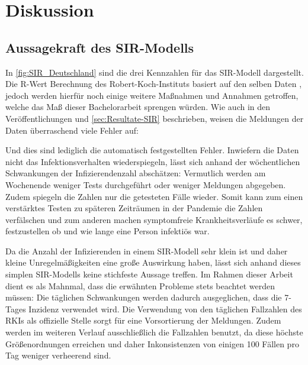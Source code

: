 \chapter{Diskussion}\label{chap:Diskussion}
\section{Aussagekraft des SIR-Modells}
In \autoref{fig:SIR_Deutschland} sind die drei Kennzahlen für das SIR-Modell dargestellt. Die R-Wert Berechnung des Robert-Koch-Instituts basiert auf den selben Daten \autocite{}, jedoch werden hierfür noch einige weitere Maßnahmen und Annahmen getroffen, welche das Maß dieser Bachelorarbeit sprengen würden.
Wie auch in den Veröffentlichungen und \autoref{sec:Resultate-SIR} beschrieben, weisen die Meldungen der Daten überraschend viele Fehler auf: 

Und dies sind lediglich die automatisch festgestellten Fehler. Inwiefern die Daten nicht das Infektionsverhalten wiederspiegeln, lässt sich anhand der wöchentlichen Schwankungen der Infizierendenzahl abschätzen: Vermutlich werden am Wochenende weniger Tests durchgeführt oder weniger Meldungen abgegeben. 
Zudem spiegeln die Zahlen nur die getesteten Fälle wieder. Somit kann zum einen verstärktes Testen zu späteren Zeiträumen in der Pandemie die Zahlen verfälschen und zum anderen machen symptomfreie Krankheitsverläufe es schwer, festzustellen ob und wie lange eine Person infektiös war.

Da die Anzahl der Infizierenden in einem SIR-Modell sehr klein ist und daher kleine Unregelmäßigkeiten eine große Auswirkung haben, lässt sich anhand dieses simplen SIR-Modells keine stichfeste Aussage treffen.
Im Rahmen dieser Arbeit dient es als Mahnmal, dass die erwähnten Probleme stets beachtet werden müssen:
Die täglichen Schwankungen werden dadurch ausgeglichen, dass die 7-Tages Inzidenz verwendet wird. Die Verwendung von den täglichen Fallzahlen des RKIs als offizielle Stelle sorgt für eine Vorsortierung der Meldungen. Zudem werden im weiteren Verlauf ausschließlich die Fallzahlen benutzt, da diese höchste Größenordnungen erreichen und daher Inkonsistenzen von einigen 100 Fällen pro Tag weniger verheerend sind.

